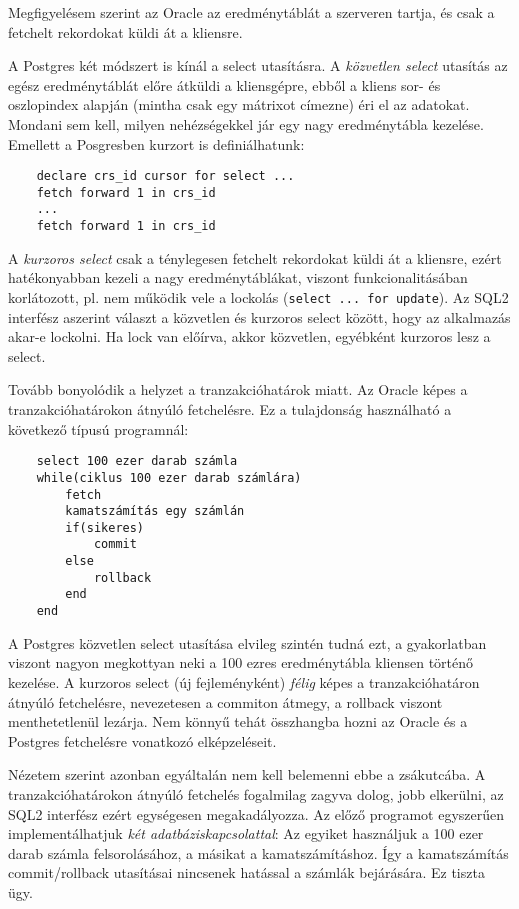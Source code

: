 Megfigyelésem szerint az Oracle az eredménytáblát a szerveren 
tartja, és csak a fetchelt rekordokat küldi át a kliensre.

A Postgres két módszert is kínál a select utasításra.
A {\em közvetlen select\/} utasítás az egész eredménytáblát előre
átküldi a kliensgépre, ebből a kliens sor- és oszlopindex alapján
(mintha csak egy mátrixot címezne) éri el az adatokat. Mondani sem
kell, milyen nehézségekkel jár egy nagy eredménytábla kezelése.
Emellett a Posgresben kurzort is definiálhatunk:
\begin{verbatim}
    declare crs_id cursor for select ...
    fetch forward 1 in crs_id
    ...
    fetch forward 1 in crs_id
\end{verbatim}
A {\em kurzoros select\/} csak a ténylegesen fetchelt rekordokat
küldi át a kliensre, ezért hatékonyabban kezeli a nagy eredménytáblákat,
viszont funkcionalitásában korlátozott, pl. nem működik vele
a lockolás (\verb!select ... for update!). Az SQL2 interfész
aszerint választ a közvetlen és kurzoros select között, hogy 
az alkalmazás akar-e lockolni. Ha lock van előírva, akkor közvetlen,
egyébként kurzoros lesz a select.

Tovább bonyolódik a helyzet a tranzakcióhatárok miatt.
Az Oracle képes a tranzakcióhatárokon átnyúló fetchelésre.
Ez a tulajdonság használható a következő típusú programnál:
\begin{verbatim}
    select 100 ezer darab számla
    while(ciklus 100 ezer darab számlára)
        fetch
        kamatszámítás egy számlán
        if(sikeres)
            commit
        else
            rollback
        end
    end
\end{verbatim}
A Postgres közvetlen select utasítása elvileg szintén tudná ezt,
a gyakorlatban viszont nagyon megkottyan neki a 100 ezres eredménytábla 
kliensen történő kezelése. A kurzoros select (új fejleményként)
{\em félig\/} képes a tranzakcióhatáron átnyúló fetchelésre,
nevezetesen a commiton átmegy, a rollback viszont
menthetetlenül lezárja. Nem könnyű tehát összhangba hozni 
az Oracle és a Postgres fetchelésre vonatkozó elképzeléseit.

Nézetem szerint azonban egyáltalán nem kell belemenni
ebbe a zsákutcába.  A tranzakcióhatárokon átnyúló fetchelés
fogalmilag zagyva dolog, jobb elkerülni, az SQL2 interfész
ezért egységesen megakadályozza.  Az előző programot egyszerűen
implementálhatjuk {\em két adatbáziskapcsolattal}:
Az egyiket használjuk a 100 ezer darab számla felsorolásához,
a másikat a kamatszámításhoz. Így a kamatszámítás commit/rollback
utasításai nincsenek hatással a számlák bejárására. Ez tiszta ügy.



